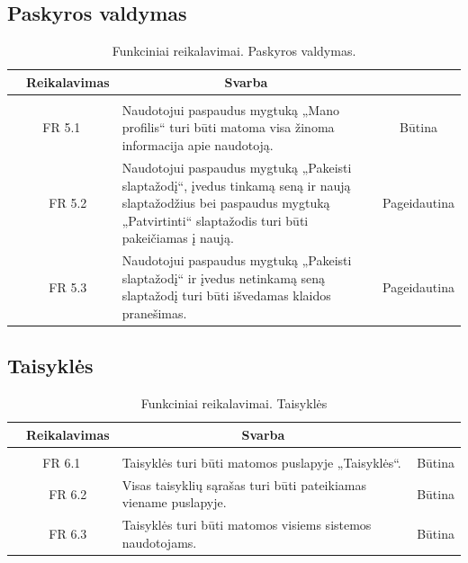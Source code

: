 \documentclass{VUMIFPSkursinis}
\begin{document}
	\subsection{Paskyros valdymas}

	\begin{table}[H]
		\caption{Funkciniai reikalavimai. Paskyros valdymas.}
		\begin{tabular}{|p{1cm}|p{1cm}|p{}|p{}|}
			\hline
			\rowcolor{gray!50}
			\multicolumn{2}{|c|}{{\bfseries Kodas}}&
			\multicolumn{1}{c|}{{\bfseries Reikalavimas}}&
			\multicolumn{1}{c|}{{\bfseries Svarba}}\\
			\hline
			\rowcolor{lightgray}
			\multicolumn{4}{|c|}{Paskyros valdymas}\\
			\hline
			\multicolumn{2}{|c|}{FR 5.1}&
			{Naudotojui paspaudus mygtuką „Mano profilis“ turi būti matoma visa žinoma informacija apie naudotoją.
			}&
			\multicolumn{1}{c|}{Būtina}\\
			\hline
			\multicolumn{1}{|c}{}&
			\multicolumn{1}{c|}{FR 5.2}&
			{Naudotojui paspaudus mygtuką „Pakeisti slaptažodį“, įvedus tinkamą seną ir naują slaptažodžius bei paspaudus mygtuką „Patvirtinti“ slaptažodis turi būti pakeičiamas į naują.
			}&
			\multicolumn{1}{c|}{Pageidautina}\\
			\hline
			\multicolumn{1}{|c}{}&
			\multicolumn{1}{c|}{FR 5.3}&
			{Naudotojui paspaudus mygtuką „Pakeisti slaptažodį“ ir įvedus netinkamą seną slaptažodį turi būti išvedamas klaidos pranešimas.
			}&
			\multicolumn{1}{c|}{Pageidautina}\\
			\hline
		\end{tabular}
	\end{table}

	\subsection{Taisyklės}
	\begin{table}[H]
		\caption{Funkciniai reikalavimai. Taisyklės}
		\begin{tabular}{|p{1cm}|p{1cm}|p{}|p{}|}
			\hline
			\rowcolor{gray!50}
			\multicolumn{2}{|c|}{{\bfseries Kodas}}&
			\multicolumn{1}{c|}{{\bfseries Reikalavimas}}&
			\multicolumn{1}{c|}{{\bfseries Svarba}}\\
			\hline
			\rowcolor{lightgray}
			\multicolumn{4}{|c|}{Taisyklės}\\

			\hline
			\multicolumn{2}{|c|}{FR 6.1}&
			{Taisyklės turi būti matomos puslapyje „Taisyklės“.
			}&
			\multicolumn{1}{c|}{Būtina}\\
			\hline
			\multicolumn{1}{|c}{}&
			\multicolumn{1}{c|}{FR 6.2}&
			{Visas taisyklių sąrašas turi būti pateikiamas viename puslapyje.
			}&
			\multicolumn{1}{c|}{Būtina}\\
			\hline
			\multicolumn{1}{|c}{}&
			\multicolumn{1}{c|}{FR 6.3}&
			{Taisyklės turi būti matomos visiems sistemos naudotojams.
			}&
			\multicolumn{1}{c|}{Būtina}\\
			\hline
		\end{tabular}
	\end{table}
\end{document}
